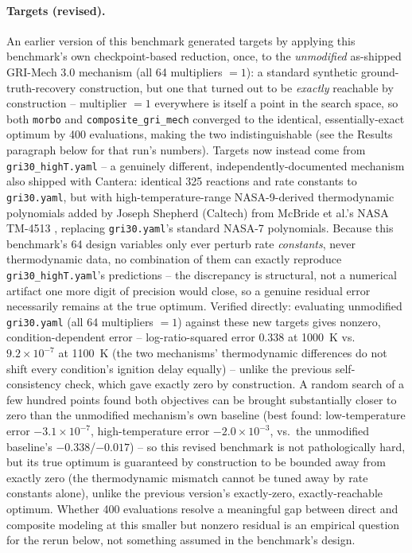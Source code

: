 \documentclass[11pt]{article}
\begin{document}
\paragraph{Targets (revised).} An earlier version of this benchmark
generated targets by applying this benchmark's own checkpoint-based
reduction, once, to the \emph{unmodified} as-shipped GRI-Mech 3.0
mechanism (all 64 multipliers $=1$): a standard synthetic
ground-truth-recovery construction, but one that turned out to be
\emph{exactly} reachable by construction -- multiplier $=1$ everywhere is
itself a point in the search space, so both \texttt{morbo} and
\texttt{composite\_gri\_mech} converged to the identical, essentially-exact
optimum by 400 evaluations, making the two indistinguishable (see the
Results paragraph below for that run's numbers). Targets now instead
come from \texttt{gri30\_highT.yaml} -- a genuinely different,
independently-documented mechanism also shipped with Cantera: identical
325 reactions and rate constants to \texttt{gri30.yaml}, but with
high-temperature-range NASA-9-derived thermodynamic polynomials added by
Joseph Shepherd (Caltech) from McBride et al.'s NASA TM-4513
\citep{mcbride1993nasapolynomials}, replacing \texttt{gri30.yaml}'s
standard NASA-7 polynomials. Because this benchmark's 64 design
variables only ever perturb rate \emph{constants}, never thermodynamic
data, no combination of them can exactly reproduce
\texttt{gri30\_highT.yaml}'s predictions -- the discrepancy is structural,
not a numerical artifact one more digit of precision would close, so a
genuine residual error necessarily remains at the true optimum. Verified
directly: evaluating unmodified \texttt{gri30.yaml} (all 64 multipliers
$=1$) against these new targets gives nonzero, condition-dependent error
-- log-ratio-squared error $0.338$ at 1000~K vs.\ $9.2\times10^{-7}$ at
1100~K (the two mechanisms' thermodynamic differences do not shift every
condition's ignition delay equally) -- unlike the previous
self-consistency check, which gave exactly zero by construction. A
random search of a few hundred points found both objectives can be
brought substantially closer to zero than the unmodified mechanism's own
baseline (best found: low-temperature error $-3.1\times10^{-7}$,
high-temperature error $-2.0\times10^{-3}$, vs.\ the unmodified baseline's
$-0.338$/$-0.017$) -- so this revised benchmark is not pathologically
hard, but its true optimum is guaranteed by construction to be bounded
away from exactly zero (the thermodynamic mismatch cannot be tuned away
by rate constants alone), unlike the previous version's exactly-zero,
exactly-reachable optimum. Whether 400 evaluations resolve a meaningful
gap between direct and composite modeling at this smaller but nonzero
residual is an empirical question for the rerun below, not something
assumed in the benchmark's design.
\end{document}
